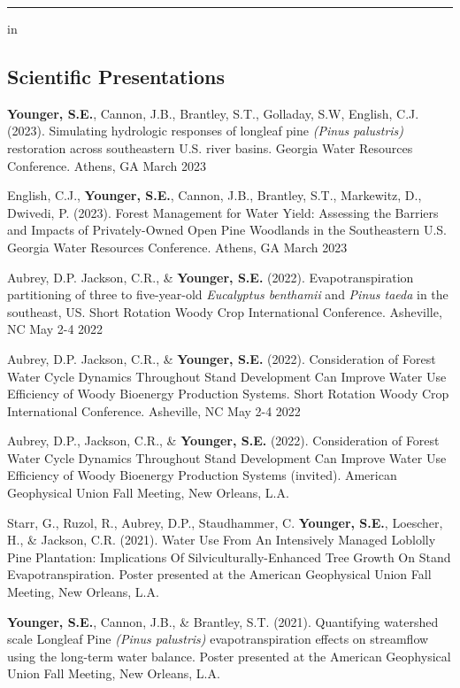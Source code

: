 \documentclass[10pt,letterpaper]{article}
\begin{document}
	\hrule
	\vspace{-0.4em}
	 in
	
	\subsection*{Scientific Presentations}
	
	\begin{hangparas}{.25in}{1}
		
		\textbf{Younger, S.E.}, Cannon, J.B., Brantley, S.T., Golladay, S.W, English, C.J. (2023). Simulating hydrologic responses of longleaf pine \textit{(Pinus palustris)} restoration across southeastern U.S. river basins. Georgia Water Resources Conference. Athens, GA March 2023
		
		English, C.J., \textbf{Younger, S.E.}, Cannon, J.B., Brantley, S.T., Markewitz, D., Dwivedi, P. (2023). Forest Management for Water Yield: Assessing the Barriers and Impacts of Privately-Owned Open Pine Woodlands in the Southeastern U.S. Georgia Water Resources Conference. Athens, GA March 2023
		
		Aubrey, D.P. Jackson, C.R., \& \textbf{Younger, S.E.} (2022). Evapotranspiration partitioning of three to five-year-old \textit{Eucalyptus benthamii} and \textit{Pinus taeda} in the southeast, US. Short Rotation Woody Crop International Conference. Asheville, NC May 2-4 2022
		
		Aubrey, D.P. Jackson, C.R., \& \textbf{Younger, S.E.} (2022). Consideration of Forest Water Cycle Dynamics Throughout Stand Development Can Improve Water Use Efficiency of Woody Bioenergy Production Systems. Short Rotation Woody Crop International Conference. Asheville, NC May 2-4 2022
		
		Aubrey, D.P., Jackson, C.R., \& \textbf{Younger, S.E.} (2022). Consideration of Forest Water Cycle Dynamics Throughout Stand Development Can Improve Water Use Efficiency of Woody Bioenergy Production Systems (invited). American Geophysical Union Fall Meeting, New Orleans, L.A.
		
		Starr, G., Ruzol, R., Aubrey, D.P., Staudhammer, C. \textbf{Younger, S.E.}, Loescher, H., \& Jackson, C.R. (2021). Water Use From An Intensively Managed Loblolly Pine Plantation: Implications Of Silviculturally-Enhanced Tree Growth On Stand Evapotranspiration. Poster presented at the American Geophysical Union Fall Meeting, New Orleans, L.A.
		
		\textbf{Younger, S.E.}, Cannon, J.B., \& Brantley, S.T. (2021). Quantifying watershed scale Longleaf Pine \textit{(Pinus palustris)} evapotranspiration effects on streamflow using the long-term water balance. Poster presented at the American Geophysical Union Fall Meeting, New Orleans, L.A.
		

\end{hangparas}
\end{document}
